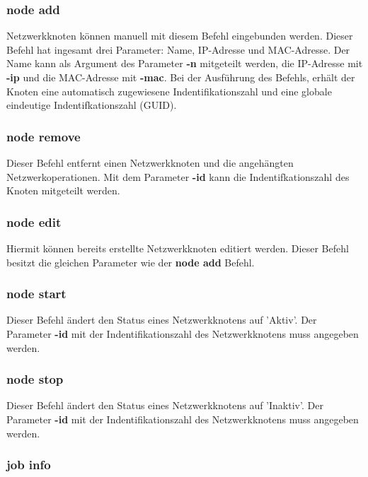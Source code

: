 \documentclass[12pt,a4paper]{report}
\begin{document}
\subsubsection{node add}

Netzwerkknoten können manuell mit diesem Befehl eingebunden werden. Dieser Befehl hat ingesamt drei Parameter: Name, IP-Adresse und MAC-Adresse. Der Name kann als Argument des Parameter \textbf{-n} mitgeteilt werden, die IP-Adresse mit \textbf{-ip} und die MAC-Adresse mit \textbf{-mac}. Bei der Ausführung des Befehls, erhält der Knoten eine automatisch zugewiesene Indentifikationszahl und eine globale eindeutige Indentifkationszahl (GUID).

\subsubsection{node remove}

Dieser Befehl entfernt einen Netzwerkknoten und die angehängten Netzwerkoperationen. Mit dem Parameter \textbf{-id} kann die Indentifkationszahl des Knoten mitgeteilt werden.

\subsubsection{node edit}

Hiermit können bereits erstellte Netzwerkknoten editiert werden. Dieser Befehl besitzt die gleichen Parameter wie der \textbf{node add} Befehl.

\subsubsection{node start}

Dieser Befehl ändert den Status eines Netzwerkknotens auf 'Aktiv'. Der Parameter \textbf{-id} mit der Indentifikationszahl des Netzwerkknotens muss angegeben werden.

\subsubsection{node stop}

Dieser Befehl ändert den Status eines Netzwerkknotens auf 'Inaktiv'. Der Parameter \textbf{-id} mit der Indentifikationszahl des Netzwerkknotens muss angegeben werden.

\subsubsection{job info}
\end{document}

